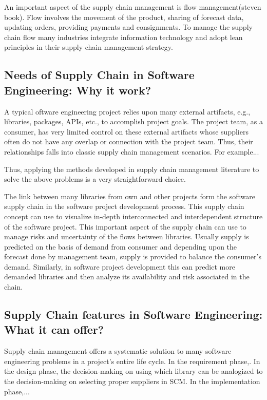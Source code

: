 \documentclass[10pt,conference]{IEEEtran}
\begin{document}
An important aspect of the supply chain management is flow management\cite{}(steven book). Flow involves the movement of the product, sharing of forecast data, updating orders, providing payments and consignments. To manage the supply chain flow many industries integrate information technology and adopt lean principles in their supply chain management strategy. 


\subsection{Needs of Supply Chain in Software Engineering: Why it work?}
A typical oftware engineering project relies upon many external artifacts, e.g., libraries, packages, APIs, etc., to accomplish project goals. The project team, as a consumer, has very limited control on these external artifacts whose suppliers often do not have any overlap or connection with the project team. Thus, their relationships falls into classic supply chain management scenarios. For example...


Thus, applying the methods developed in supply chain management literature to solve the above problems is a very straightforward choice.

The link between many libraries from own and other projects form the software supply chain in the software project development process. This supply chain concept can use to visualize in-depth interconnected and interdependent structure of the software project. This important aspect of the supply chain can use to manage risks and uncertainty of the flows between libraries. Usually supply is predicted on the basis of demand from consumer and depending upon the forecast done by management team, supply is provided to balance the consumer's demand. Similarly, in software project development this can predict more demanded libraries and then analyze its availability and risk associated in the chain. 


\subsection{Supply Chain features in Software Engineering: What it can offer?}
Supply chain management offers a systematic solution to many software engineering problems in a project's entire life cycle. In the requirement phase,. In the design phase, the decision-making on using which library can be analogized to the decision-making on selecting proper suppliers in SCM. In the implementation phase,...  
\end{document}
